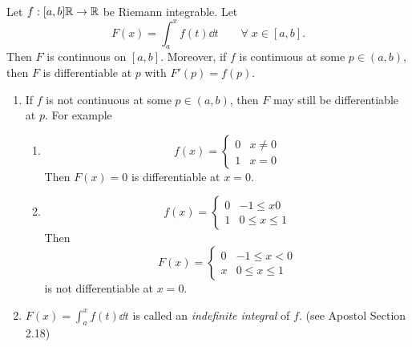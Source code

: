 \begin{thm} \label{thm:integration:IFTOC} ~\\
    Let $f : [a, b] \mathbb{R} \to \mathbb{R}$ be Riemann integrable.
    Let \[
        F(x) = \int_{a}^{x} f(t) \dd t \qquad \forall\; x \in [a, b].
    \] Then $F$ is continuous on $[a, b]$. Moreover, if $f$ is continuous at some $p \in (a, b)$, then $F$ is differentiable at $p$ with $F'(p) = f(p)$.
\end{thm}
\begin{rem} \leavevmode
    \begin{enumerate}[label=(\alph*)]
        \item If $f$ is not continuous at some $p \in (a, b)$, then $F$ may still be differentiable at $p$. For example 
        \begin{enumerate}[label=(\roman*)]
            \item \[
                f(x) = \begin{cases}
                    0 & x \neq 0 \\
                    1 & x = 0
                \end{cases}
            \] Then $F(x) = 0$ is differentiable at $x = 0$.
            \item \[
                f(x) = \begin{cases}
                    0 & -1 \leq x  0 \\
                    1 & 0 \leq x \leq 1
                \end{cases}
            \] Then \[
                F(x) = \begin{cases}
                    0 & -1 \leq x < 0 \\
                    x & 0 \leq x \leq 1
                \end{cases}
            \] is not differentiable at $x = 0$.
        \end{enumerate}

        \item $F(x) = \int_{a}^{x} f(t) \dd t$ is called an \emph{indefinite integral} of $f$. (see Apostol Section 2.18) 
    \end{enumerate}
\end{rem}

